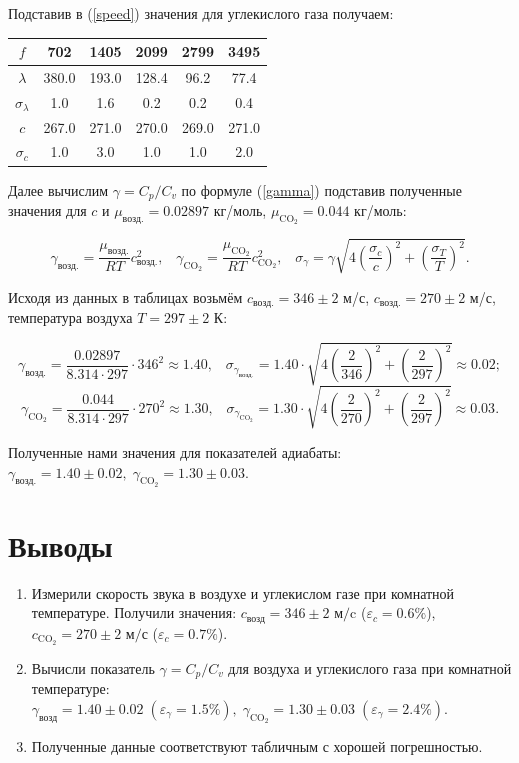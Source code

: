 \documentclass[a4paper,12pt]{article} %
\begin{document}
Подставив в (\ref{speed}) значения для углекислого газа получаем:
\begin{center}
\begin{tabular}{|c|c|c|c|c|c|}
\hline
$ f $ & 702 & 1405 & 2099 & 2799 & 3495 \\
\hline
$ \lambda$ & 380.0 & 193.0 & 128.4 & 96.2 & 77.4 \\
\hline
$ \sigma_{\lambda}$ & 1.0 & 1.6 & 0.2 & 0.2 & 0.4 \\
\hline
$ c $ & 267.0 & 271.0 & 270.0 & 269.0 & 271.0 \\
\hline
$ \sigma_c $ & 1.0 & 3.0 & 1.0 & 1.0 & 2.0 \\
\hline
\end{tabular}
\end{center}

Далее вычислим $\gamma = C_p / C_v $ по формуле (\ref{gamma}) подставив полученные значения для $c$ и $\mu_{возд.} = 0.02897$ кг/моль, $ \mu_{\text{CO}_2} = 0.044 $ кг/моль:

\[
\gamma_{возд.} = \frac{\mu_{возд.}}{RT} c^2_{\text{возд.}}, \;\;\; \gamma_{\text{CO}_2} = \frac{\mu_{\text{CO}_2}}{RT} c^2_{\text{CO}_2}, \;\;\; \sigma_{\gamma} = \gamma \sqrt{4 \left(\frac{\sigma_c}{c} \right)^2 + \left(\frac{\sigma_T}{T} \right)^2}.
\]

\noindent Исходя из данных в таблицах возьмём $c_{\text{возд.}} = 346 \pm 2$ м/с,  $c_{\text{возд.}} = 270 \pm 2$ м/с, температура воздуха $T = 297 \pm 2$ К:

\[
\gamma_{\text{возд.}} = \frac{0.02897}{8.314 \cdot 297} \cdot 346^2 \approx 1.40 ,\;\;\;
\sigma_{\gamma_\text{возд.}} = 1.40 \cdot \sqrt{4 \left(\frac{2}{346} \right)^2 + \left(\frac{2}{297} \right)^2} \approx 0.02  ;
\]
\[
\gamma_{\text{CO}_2} = \frac{0.044}{8.314 \cdot 297} \cdot 270^2 \approx 1.30 ,\;\;\;
\sigma_{\gamma_{\text{CO}_2}} = 1.30 \cdot \sqrt{4 \left(\frac{2}{270} \right)^2 + \left(\frac{2}{297} \right)^2} \approx 0.03 .
\]

Полученные нами значения для показателей адиабаты: $ \gamma_{\text{возд.}} = 1.40 \pm 0.02, \; \gamma_{\text{CO}_2} = 1.30 \pm 0.03 $.

\section{Выводы}

\begin{enumerate}
\item
Измерили скорость звука в воздухе и углекислом газе при комнатной температуре. Получили значения: $c_{\text{возд}} = 346 \pm 2$ м$/$c ($\varepsilon_c = 0.6 \% $), $c_{\text{CO}_2} = 270 \pm 2$ м$/$с ($ \varepsilon_c = 0.7 \% $).

\item
Вычисли показатель $\gamma = C_p/C_v$ для воздуха и углекислого газа при комнатной температуре: $\gamma_{\text{возд}} = 1.40 \pm 0.02 \; (\varepsilon_\gamma = 1.5 \%), \; \gamma_{\text{CO}_2} = 1.30 \pm 0.03 \; (\varepsilon_\gamma = 2.4 \%)$.

\item
Полученные данные соответствуют табличным с хорошей погрешностью.

\end{enumerate}
\end{document}
